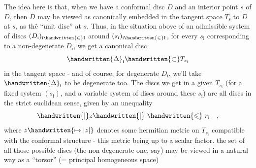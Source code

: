 The idea here is that, when we have a conformal disc $D$ and an interior point $s$ of $D$, then $D$ may be viewed as canonically embedded in the tangent space $T_{\mathrm s}$ to $D$ at $s$, as th\^{e} ``unit disc'' at $s$. Thus, in the situation above of an admissible system of discs $(D_{\mathrm i})_{\mathrm i\handwritten{\in}\mathrm I}$ around $(s_{\mathrm i})_{\mathrm i\handwritten{\in}\mathrm I}$, for every $s_{\mathrm i}$ corresponding to a non-degenerate $D_{\mathrm i}$, we get a canonical disc
\[
\handwritten{\Delta}_{\mathrm i}\handwritten{\subset} T_{s_{\mathrm i}}
\]
in the tangent space - and of course, for degenerate $D_{\mathrm i}$, we'll take $\handwritten{\Delta}_{\mathrm i}$ to be degenerate too. The discs we get in a given $T_{s_{\mathrm i}}$ (for a fixed system $(s_{\mathrm i})$, and a variable  system of discs around these $s_{\mathrm i}$) are all discs in the strict euclidean sense, given by an unequality
\[
\handwritten{|}z\handwritten{|}\ \handwritten{\leqslant}\ r_{\mathrm i}\quad,
\]
where $z\handwritten{\mapsto|z|}$ denotes some hermitian metric on $T_{s_{\mathrm i}}$ compatible with the conformal structure - this metric being  up to a scalar factor. the set  of all those possible discs (the non-degenerate one\deleted{\unsure{,}}, say) may be viewed in a natural way as a ``torsor'' (= principal homogeneous space)
